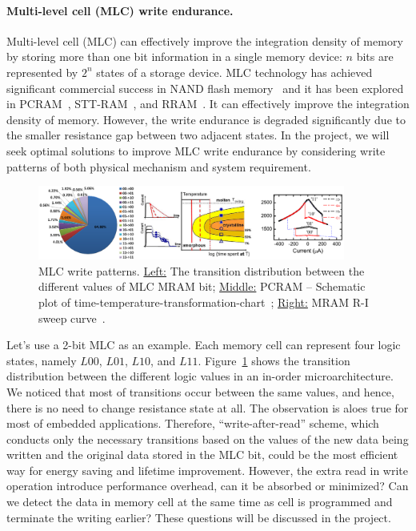 \paragraph{Multi-level cell (MLC) write endurance.} Multi-level cell (MLC) can effectively improve the integration density of memory by storing more than one bit information in a single memory device: $n$ bits are represented by  $2^n$ states of a storage device. MLC technology has achieved significant commercial success in NAND flash memory~\cite{Park04} and it has been explored in PCRAM~\cite{Raoux08,Bedeschi09}, STT-RAM~\cite{Lou08}, and RRAM~\cite{Baek05}. It can effectively improve the integration density of memory. However, the write endurance is degraded significantly due to the smaller resistance gap between two adjacent states. In the project, we will seek optimal solutions to improve MLC write endurance by considering write patterns of both physical mechanism and system requirement.

\begin{figure}
\centering
\vspace{-10pt}
\includegraphics[width=0.9\textwidth]{./figure/4_mlc.pdf}
\vspace{-10pt}
\caption{MLC write patterns. \underline{Left:} The transition distribution between the different values of MLC MRAM bit; \underline{Middle:} PCRAM -- Schematic plot of time-temperature-transformation-chart~\cite{Nirschl07}; \underline{Right:} MRAM R-I sweep curve~\cite{Lou08}.}
\label{mlc}
\vspace{-10pt}
\end{figure}

Let's use a 2-bit MLC as an example. Each memory cell can represent four logic states, namely $L00$, $L01$, $L10$, and $L11$.  Figure~\ref{mlc} shows the transition distribution between the different logic values in an in-order microarchitecture. We noticed that most of transitions occur between the same values, and hence, there is no need to change resistance state at all. The observation is aloes true for most of embedded applications. Therefore, ``write-after-read'' scheme, which conducts only the necessary transitions based on the values of the new data being written and the original data stored in the MLC bit, could be the most efficient way for energy saving and lifetime improvement. However, the extra read in write operation introduce performance overhead, can it be absorbed or minimized? Can we detect the data in memory cell at the same time as cell is programmed and terminate the writing earlier? These questions will be discussed in the project.

